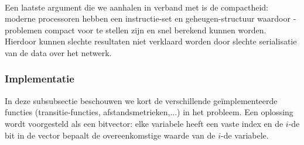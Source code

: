 \paragraph{}
Een laatste argument die we aanhalen in verband met  is de compactheid: moderne processoren hebben een instructie-set en geheugen-structuur waardoor -problemen compact voor te stellen zijn en snel berekend kunnen worden. Hierdoor kunnen slechte resultaten niet verklaard worden door slechte serialisatie van de data over het netwerk.

\subsubsection{Implementatie}

In deze subsubsectie beschouwen we kort de verschillende ge\"implementeerde functies (transitie-functies, afstandsmetrieken,...) in het  probleem. Een oplossing wordt voorgesteld als een bitvector: elke variabele heeft een vaste index en de $i$-de bit in de vector bepaalt de overeenkomstige waarde van de $i$-de variabele.

